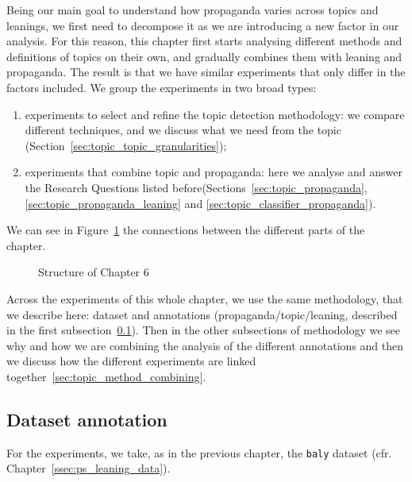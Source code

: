 Being our main goal to understand how propaganda varies across topics and leanings, we first need to decompose it as we are introducing a new factor in our analysis.
For this reason, this chapter first starts analysing different methods and definitions of topics on their own, and gradually combines them with leaning and propaganda. The result is that we have similar experiments that only differ in the factors included.
We group the experiments in two broad types:
\begin{enumerate}
    \item experiments to select and refine the topic detection methodology: we compare different techniques, and we discuss what we need from the topic (Section~\ref{sec:topic_topic_granularities}); 
    \item experiments that combine topic and propaganda: here we analyse and answer the Research Questions listed before(Sections~\ref{sec:topic_propaganda}, \ref{sec:topic_propaganda_leaning} and \ref{sec:topic_classifier_propaganda}).
\end{enumerate}

We can see in Figure~\ref{fig:methodology_mindmap_chapter6} the connections between the different parts of the chapter.


\begin{figure}[!htbp]
    \centering
    \resizebox{\textwidth}{!}{
    \trimbox{2cm 1cm 2cm 1cm}{
    }}
    \caption{Structure of Chapter 6}
    \label{fig:methodology_mindmap_chapter6}
\end{figure}


Across the experiments of this whole chapter, we use the same methodology, that we describe here: dataset and annotations (propaganda/topic/leaning, described in the first subsection~\ref{sec:topic_method_data}).
Then in the other subsections of methodology we see why and how we are combining the analysis of the different annotations and then we discuss how the different experiments are linked together~\ref{sec:topic_method_combining}. %


\subsection{\statusgreen Dataset annotation}
\label{sec:topic_method_data}

For the experiments, we take, as in the previous chapter, the \texttt{baly} dataset (cfr. Chapter~\ref{ssec:ps_leaning_data}).

